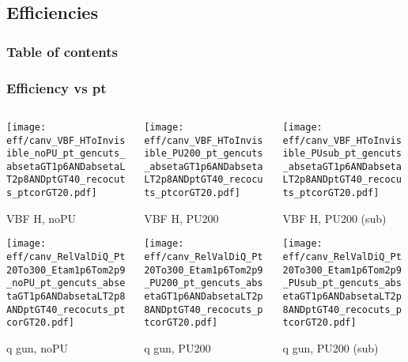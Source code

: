 \documentclass[8pt]{beamer}
\begin{document}
\subsection{Efficiencies}

\begin{frame}
 \frametitle{Table of contents}
 
\end{frame}

 \begin{frame}
  \frametitle{Efficiency vs pt}
  
  \begin{columns}
   \begin{column}{0.35\textwidth}
     \texttt{[image: eff/canv\_VBF\_HToInvisible\_noPU\_pt\_gencuts\_absetaGT1p6ANDabsetaLT2p8ANDptGT40\_recocuts\_ptcorGT20.pdf]}
     
     VBF H, noPU
    
     \texttt{[image: eff/canv\_RelValDiQ\_Pt20To300\_Etam1p6Tom2p9\_noPU\_pt\_gencuts\_absetaGT1p6ANDabsetaLT2p8ANDptGT40\_recocuts\_ptcorGT20.pdf]}
     
     q gun, noPU
   \end{column}
   \begin{column}{0.35\textwidth}
     \texttt{[image: eff/canv\_VBF\_HToInvisible\_PU200\_pt\_gencuts\_absetaGT1p6ANDabsetaLT2p8ANDptGT40\_recocuts\_ptcorGT20.pdf]}
     
     VBF H, PU200
    
     \texttt{[image: eff/canv\_RelValDiQ\_Pt20To300\_Etam1p6Tom2p9\_PU200\_pt\_gencuts\_absetaGT1p6ANDabsetaLT2p8ANDptGT40\_recocuts\_ptcorGT20.pdf]}
     
     q gun, PU200
   \end{column}
   \begin{column}{0.35\textwidth}
     \texttt{[image: eff/canv\_VBF\_HToInvisible\_PUsub\_pt\_gencuts\_absetaGT1p6ANDabsetaLT2p8ANDptGT40\_recocuts\_ptcorGT20.pdf]}
     
     VBF H, PU200 (sub)
    
     \texttt{[image: eff/canv\_RelValDiQ\_Pt20To300\_Etam1p6Tom2p9\_PUsub\_pt\_gencuts\_absetaGT1p6ANDabsetaLT2p8ANDptGT40\_recocuts\_ptcorGT20.pdf]}
     
     q gun, PU200 (sub)
   \end{column}
  \end{columns}
 \end{frame}
 
\end{document}
